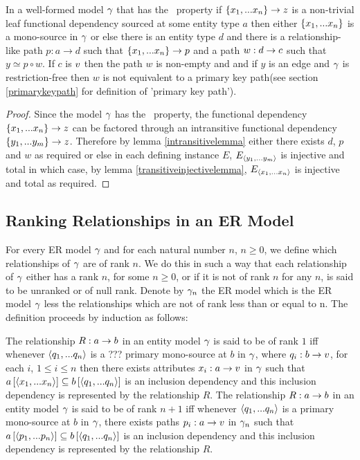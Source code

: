\begin{lemma}
\label{mainlemma}
In a well-formed model $\gamma$ that has the \fdfactoring\ property if $\left\{x_1,...x_n\right\} \rightarrow z$ is a non-trivial leaf functional dependency sourced
at some entity type $a$ then either $\left\{x_1,...x_n\right\}$ is a mono-source in $\gamma$
or else there is an entity type $d$ and there is a relationship-like path $p:a \rightarrow d$ such that $\{x_1,...x_n\} \rightarrow p$
and a  path $w:d \rightarrow c$  such that $y \simeq p \circ w$. If $c$ is $v$ then
the path $w$ is non-empty and and if $y$ is an edge and $\gamma$ is restriction-free then $w$ is not equivalent to a primary key path(see section \ref{primarykeypath} for definition of 'primary key path').
\end{lemma}
\begin{proof}
Since the model $\gamma$  has the \fdfactoring\ property, the functional dependency $\left\{x_1,...x_n\right\} \rightarrow z$ can be factored through an intransitive functional
dependency $\left\{y_1,...y_m\right\} \rightarrow z$. Therefore by lemma \ref{intransitivelemma} either there exists $d$, $p$ and $w$ as required
or else in each defining instance $E$, $E_{\langle y_1,...y_m\rangle}$ is injective and total in which case, by lemma \ref{transitiveinjectivelemma}, $E_{\langle x_1,...x_n\rangle}$ is injective and total as required.
\end{proof}

\subsection{Ranking Relationships in an ER Model}
For every ER model $\gamma$ and for each natural number $n$, $n \geq 0$, we define which relationships of
$\gamma$ are of rank $n$. We do this  in such a way that each relationship of $\gamma$ either has a rank $n$, for some $n \geq 0$, or if it is not of rank 
$n$ for any $n$, is said to be unranked or of null rank. Denote by $\gamma_n$ the ER model which is the ER model 
$\gamma$ less the relationships which are not of rank less than or equal to n. The definition proceeds by induction as follows:
\begin{definition}
The relationship $R: a \rightarrow b$ in an entity model $\gamma$ is said to be of rank $1$ iff whenever 
$\langle q_1,...q_n\rangle$ is a  ??? primary mono-source at $b$ in $\gamma$, where $q_i:b \rightarrow v$, for each $i$, $1 \leq i \leq n$  then there exists attributes $x_i:a \rightarrow v$ in $\gamma$ such that $a\left[\langle x_1,...x_n\rangle\right]\subseteq b\left[\langle q_1,...q_n\rangle\right]$ is an inclusion dependency and this inclusion dependency is represented by the relationship $R$. 
The relationship $R: a \rightarrow b$ in an entity model $\gamma$ is said to be of rank $n+1$ iff whenever 
$\langle q_1,...q_n\rangle$ is a primary mono-source at $b$ in $\gamma$, there exists paths $p_i:a \rightarrow v$ in $\gamma_n$ such that $a\left[\langle p_1,...p_n\rangle\right]\subseteq b\left[\langle q_1,...q_n\rangle\right]$ is an inclusion dependency and this inclusion dependency  is represented by the relationship $R$. 
\end{definition}

